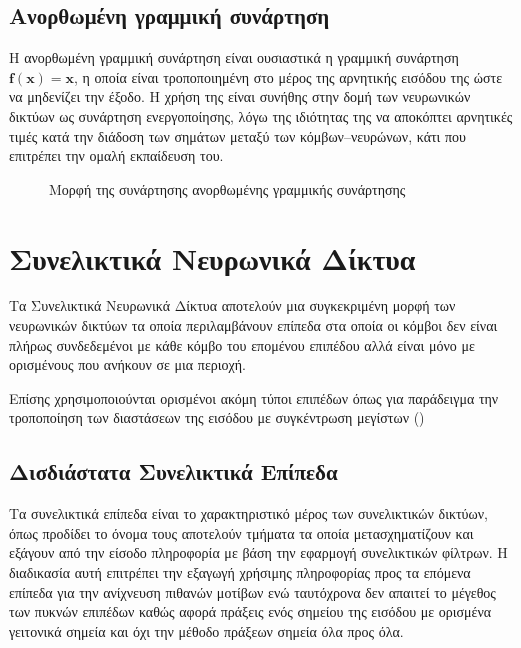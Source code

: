 \subsection{Ανορθωμένη γραμμική συνάρτηση }
Η ανορθωμένη γραμμική συνάρτηση  είναι ουσιαστικά η γραμμική συνάρτηση $\mathit{\mathbf{f\left(x\right) = x}}$, η οποία είναι τροποποιημένη στο μέρος της αρνητικής εισόδου της ώστε να μηδενίζει την έξοδο. Η χρήση της είναι συνήθης στην δομή των νευρωνικών δικτύων ως συνάρτηση ενεργοποίησης, λόγω της ιδιότητας της να αποκόπτει αρνητικές τιμές κατά την διάδοση των σημάτων μεταξύ των κόμβων--νευρώνων, κάτι που επιτρέπει την ομαλή εκπαίδευση του.

\begin{figure}[H]
  \begin{center}
    
    \caption{Μορφή της συνάρτησης ανορθωμένης γραμμικής συνάρτησης }
  \end{center}
\end{figure}

\section{Συνελικτικά Νευρωνικά Δίκτυα}
Τα Συνελικτικά Νευρωνικά Δίκτυα αποτελούν μια συγκεκριμένη μορφή των νευρωνικών δικτύων τα οποία περιλαμβάνουν επίπεδα στα οποία οι κόμβοι δεν είναι πλήρως συνδεδεμένοι με κάθε κόμβο του επομένου επιπέδου αλλά είναι μόνο με ορισμένους που ανήκουν σε μια περιοχή. 

Επίσης χρησιμοποιούνται ορισμένοι ακόμη τύποι επιπέδων όπως για παράδειγμα την τροποποίηση των διαστάσεων της εισόδου με συγκέντρωση μεγίστων ()

\subsection{Δισδιάστατα Συνελικτικά Επίπεδα}
Τα συνελικτικά επίπεδα είναι το χαρακτηριστικό μέρος των συνελικτικών δικτύων, όπως προδίδει το όνομα τους αποτελούν τμήματα τα οποία μετασχηματίζουν και εξάγουν από την είσοδο πληροφορία με βάση την εφαρμογή συνελικτικών φίλτρων. Η διαδικασία αυτή επιτρέπει την εξαγωγή χρήσιμης πληροφορίας προς τα επόμενα επίπεδα για την ανίχνευση πιθανών μοτίβων ενώ ταυτόχρονα δεν απαιτεί το μέγεθος των πυκνών  επιπέδων καθώς αφορά πράξεις ενός σημείου της εισόδου με ορισμένα γειτονικά σημεία και όχι την μέθοδο πράξεων σημεία όλα προς όλα.

